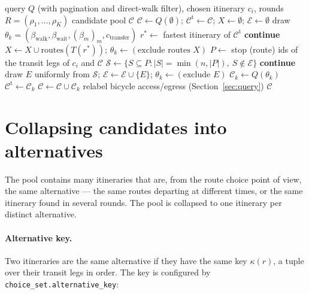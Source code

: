 \documentclass[11pt,a4paper]{article}
\newcommand{\code}[1]{\texttt{#1}}
\newcommand{\cand}{\mathcal{C}}
\newcommand{\key}{\kappa}
\begin{document}
\begin{algorithm}[htbp]
\caption{Candidate generation for one trip $i$}
\label{alg:candidates}
\begin{algorithmic}[1]
\Require query $Q$ (with pagination and direct-walk filter), chosen itinerary $c_i$, rounds $R = (\rho_1,\dots,\rho_K)$
\Ensure candidate pool $\cand$
\State $\cand \gets Q(\emptyset)$; \quad $\cand^{\text{t}} \gets \cand$; \quad $X \gets \emptyset$; \quad $\mathcal{E} \gets \emptyset$
    \State draw $\theta_k = (\beta_{\text{walk}}, \beta_{\text{wait}}, (\beta_m)_{m}, c_{\text{transfer}})$
    \State $r^* \gets$ fastest itinerary of $\cand^{\text{t}}$
     \textbf{continue} \EndIf
    \State $X \gets X \cup \text{routes}(T(r^*))$; \quad $\theta_k \gets (\text{exclude routes } X)$
  \Else {}
    \State $P \gets$ stop (route) ids of the transit legs of $c_i$ and $\cand$
    \State $\mathcal{S} \gets \{ S \subseteq P : |S| = \min(n,|P|),\ S \notin \mathcal{E} \}$
     \textbf{continue} \EndIf
    \State draw $E$ uniformly from $\mathcal{S}$; \quad $\mathcal{E} \gets \mathcal{E} \cup \{E\}$; \quad $\theta_k \gets (\text{exclude } E)$
  \EndIf
  \State $\cand_k \gets Q(\theta_k)$
   $\cand^{\text{t}} \gets \cand_k$ \EndIf
  \State $\cand \gets \cand \cup \cand_k$ 
\EndFor
\State relabel bicycle access/egress (Section~\ref{sec:query})
\State \Return $\cand$
\end{algorithmic}
\end{algorithm}

\section{Collapsing candidates into alternatives}
\label{sec:collapse}

The pool contains many itineraries that are, from the route choice point of view, the same
alternative --- the same routes departing at different times, or the same itinerary found in several
rounds. The pool is collapsed to one itinerary per distinct alternative.

\paragraph{Alternative key.} Two itineraries are the same alternative if they have the same key
$\key(r)$, a tuple over their transit legs in order. The key is configured by
\code{choice\_set.alternative\_key}:
\end{document}
